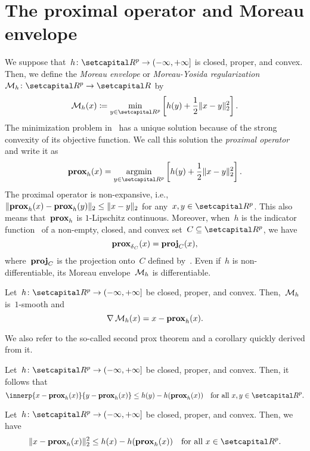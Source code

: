 \documentclass[../main]{subfiles}
\begin{document}
\section{The proximal operator and Moreau envelope}
We suppose that~$h \colon \setR^p \to (-\infty, +\infty]$ is closed, proper, and convex.
Then, we define the \emph{Moreau envelope} or \emph{Moreau-Yosida regularization}~$\envelope_h \colon \setR^p \to \setR$ by
\begin{equation} \label{eq:Moreau_env}
    \envelope_h(x) \coloneqq \min_{y \in \setR^p} \left[ h(y) + \frac{1}{2} \norm{x - y}_2^2 \right]
    .\end{equation}
The minimization problem in~ has a unique solution because of the strong convexity of its objective function.
We call this solution the \emph{proximal operator} and write it as
\begin{equation} \label{eq:prox}
    \prox_h(x) = \argmin_{y \in \setR^p} \left[ h(y) + \frac{1}{2} \norm{x - y}_2^2 \right]
    .\end{equation}
The proximal operator is non-expansive, i.e.,~$\lVert\operatorname{\mathbf{prox}}_h(x) - \operatorname{\mathbf{prox}}_h(y)\rVert_2 \le \lVert x - y\rVert_2$ for any~$x, y \in \setR^p$.
This also means that~$\operatorname{\mathbf{prox}}_h$ is $1$-Lipschitz continuous.
Moreover, when~$h$ is the indicator function~ of a non-empty, closed, and convex set~$C \subseteq \setR^p$, we have
\begin{equation} \label{eq:prox_ind}
    \operatorname{\mathbf{prox}}_{\operatorname{\delta}_C}(x) = \operatorname{\mathbf{proj}}_C(x)
    ,\end{equation}
where~$\operatorname{\mathbf{proj}}_C$ is the projection onto~$C$ defined by~.
Even if~$h$ is non-differentiable, its Moreau envelope~$\operatorname{\mathcal{M}}_h$ is differentiable.
\begin{theorem} 
    Let~$h \colon \setR^p \to (-\infty, +\infty]$ be closed, proper, and convex.
    Then,~$\operatorname{\mathcal{M}}_h$ is~$1$-smooth and
    \begin{equation}
        \nabla \operatorname{\mathcal{M}}_h(x) = x - \operatorname{\mathbf{prox}}_h(x)
        .\end{equation}
\end{theorem}
We also refer to the so-called second prox theorem and a corollary quickly derived from it.
\begin{theorem} 
    Let~$h \colon \setR^p \to (-\infty, +\infty]$ be closed, proper, and convex.
    Then, it follows that
    \begin{equation}
        \innerp{x - \prox_h(x)}{y - \prox_h(x)} \le h(y) - h(\prox_h(x)) \forallcondition{x, y \in \setR^p}
        .\end{equation}
\end{theorem}
\begin{corollary} 
    Let~$h \colon \setR^p \to (-\infty, +\infty]$ be closed, proper, and convex.
    Then, we have
    \begin{equation}
        \norm{x - \prox_h(x)}_2^2 \le h(x) - h(\prox_h(x)) \forallcondition{x \in \setR^p}
        .\end{equation}
\end{corollary}
\end{document}
